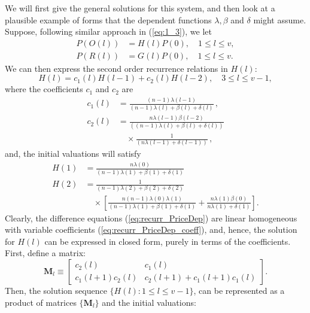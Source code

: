 \documentclass{comjnl}
\begin{document}
We will first give the general solutions for this system, and then
look at a plausible example of forms that the dependent functions
$\lambda, \beta$ and $\delta$ might assume. Suppose, following
similar approach in (\ref{eq:1_3}), we let
\begin{align*}
P(O(l)) &= H(l) P(0),  \quad 1\leq  l \leq v, \\
P(R(l)) &= G(l) P(0), \quad 1 \leq l \leq v.
\end{align*}
We can then express the second order recurrence relations in
$H(l)$:
\begin{equation}\label{eq:recurr_PriceDep}
H(l) = c_1(l) H(l-1) + c_2(l) H(l-2), \quad 3 \leq l \leq v-1,
\end{equation}
where the coefficients $c_1$ and $c_2$ are
\begin{align}\label{eq:recurr_PriceDep_coeff}
c_1(l) &=
\frac{(n-1)\lambda(l-1)}{(n-1)\lambda(l)+\beta(l)+\delta(l)} \, ,\\
c_2(l) &= \frac{n\lambda(l-1)
\beta(l-2)}{\left((n-1)\lambda(l)+\beta(l)+\delta(l)\right) } \nonumber\\
&\quad \times \frac{1}{\left( n\lambda(l-1)+\delta(l-1)\right)} \,
,\nonumber
\end{align}
and, the initial valuations will satisfy
\begin{align}
H(1) &=
\frac{n\lambda(0)}{(n-1)\lambda(1)+\beta(1)+\delta(1)} \\
H(2) &= \frac{1}{(n-1)\lambda(2)+\beta(2)+\delta(2)} \nonumber\\
&\quad\times\left[\frac{n(n-1)\lambda(0)\lambda(1)}{(n-1)\lambda(1)+\beta(1)+\delta(1)}+
\frac{n\lambda(1)\beta(0)}{n\lambda(1)+\delta(1)} \right]
\nonumber.
\end{align}
Clearly, the difference equations (\ref{eq:recurr_PriceDep}) are
linear homogeneous with variable coefficients
(\ref{eq:recurr_PriceDep_coeff}), and, hence, the solution for
$H(l)$ can be expressed in closed form, purely in terms of the
coefficients\cite{popenda87,mallik97,boese02}. First, define a
matrix:
\begin{equation}
\mathbf{M}_l \equiv \begin{bmatrix}
c_2(l) & c_1(l) \\
c_1(l+1)c_2(l) & c_2(l+1)+c_1(l+1)c_1(l)
\end{bmatrix}.
\end{equation}
Then, the solution sequence $\{H(l): 1\leq l \leq v-1\}$, can be
represented as a product of matrices $\{\mathbf{M}_l\}$ and the
initial valuations:
\end{document}
